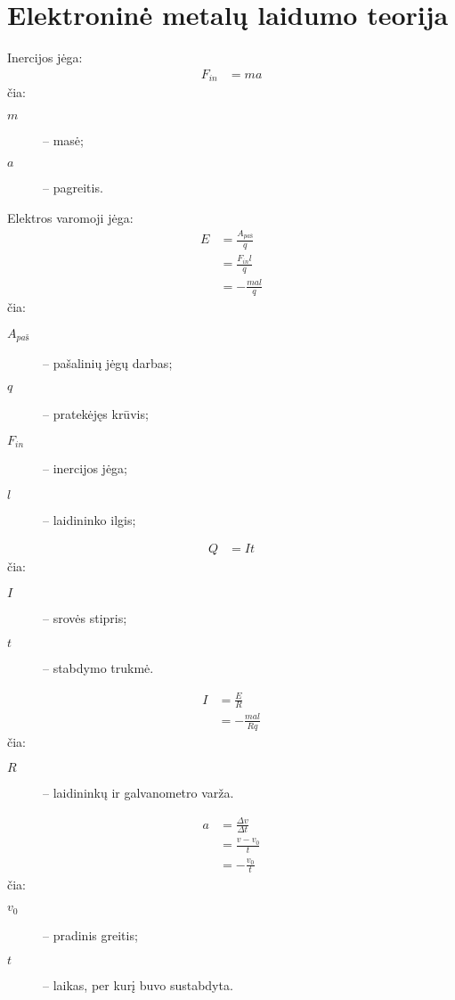 \section{Elektroninė metalų laidumo teorija}

Inercijos jėga:
\begin{align*}
  F_{in} &= ma
\end{align*}
čia:
\begin{description}
  \item[$m$] – masė;
  \item[$a$] – pagreitis.
\end{description}

Elektros varomoji jėga:
\begin{align*}
  E &= \frac{A_{paš}}{q} \\
  &= \frac{F_{in} l}{q} \\
  &= -\frac{mal}{q}
\end{align*}
čia:
\begin{description}
  \item[$A_{paš}$] – pašalinių jėgų darbas;
  \item[$q$] – pratekėjęs krūvis;
  \item[$F_{in}$] – inercijos jėga;
  \item[$l$] – laidininko ilgis;
\end{description}

\begin{align*}
  Q &= I t
\end{align*}
čia:
\begin{description}
  \item[$I$] – srovės stipris;
  \item[$t$] – stabdymo trukmė.
\end{description}

\begin{align*}
  I &= \frac{E}{R} \\
  &= -\frac{mal}{Rq}
\end{align*}
čia:
\begin{description}
  \item[$R$] – laidininkų ir galvanometro varža.
\end{description}

\begin{align*}
  a &= \frac{\Delta v}{\Delta t} \\
  &= \frac{v - v_{0}}{t} \\
  &= -\frac{v_{0}}{t}
\end{align*}
čia:
\begin{description}
  \item[$v_{0}$] – pradinis greitis;
  \item[$t$] – laikas, per kurį buvo sustabdyta.
\end{description}

